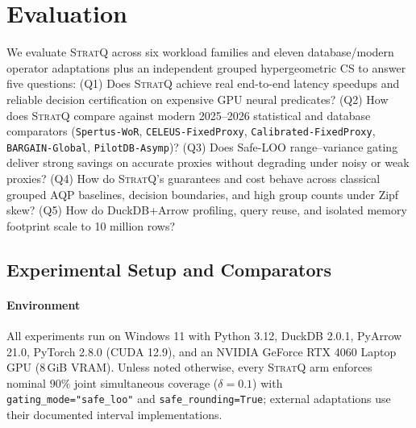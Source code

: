 \section{Evaluation}
\label{sec:eval}

We evaluate \textsc{StratQ} across six workload families and eleven database/modern operator adaptations plus an independent grouped hypergeometric CS to answer five questions:
(Q1) Does \textsc{StratQ} achieve real end-to-end latency speedups and reliable decision certification on expensive GPU neural predicates?
(Q2) How does \textsc{StratQ} compare against modern 2025--2026 statistical and database comparators (\texttt{Spertus-WoR}, \texttt{CELEUS-FixedProxy}, \texttt{Calibrated-FixedProxy}, \texttt{BARGAIN-Global}, \texttt{PilotDB-Asymp})?
(Q3) Does Safe-LOO range--variance gating deliver strong savings on accurate proxies without degrading under noisy or weak proxies?
(Q4) How do \textsc{StratQ}'s guarantees and cost behave across classical grouped AQP baselines, decision boundaries, and high group counts under Zipf skew?
(Q5) How do DuckDB+Arrow profiling, query reuse, and isolated memory footprint scale to 10 million rows?

\subsection{Experimental Setup and Comparators}
\label{sec:eval-setup}

\paragraph{Environment}
All experiments run on Windows 11 with Python 3.12, DuckDB 2.0.1, PyArrow 21.0, PyTorch 2.8.0 (CUDA 12.9), and an NVIDIA GeForce RTX 4060 Laptop GPU (8\,GiB VRAM).
Unless noted otherwise, every \textsc{StratQ} arm enforces nominal $90\%$ joint simultaneous coverage ($\delta = 0.1$) with \texttt{gating\_mode="safe\_loo"} and \texttt{safe\_rounding=True}; external adaptations use their documented interval implementations.

